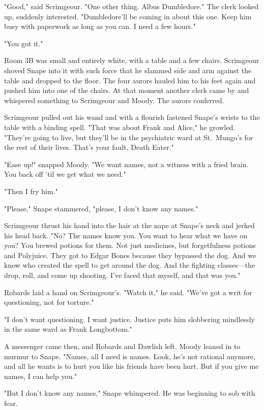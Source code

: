 "Good," said Scrimgeour. "One other thing. Albus Dumbledore." The clerk looked up, suddenly interested. "Dumbledore'll be coming in about this one. Keep him busy with paperwork as long as you can. I need a few hours."

"You got it."

Room 3B was small and entirely white, with a table and a few chairs. Scrimgeour shoved Snape into it with such force that he slammed side and arm against the table and dropped to the floor. The four aurors hauled him to his feet again and pushed him into one of the chairs. At that moment another clerk came by and whispered something to Scrimgeour and Moody. The aurors conferred.

Scrimgeour pulled out his wand and with a flourish fastened Snape's wrists to the table with a binding spell. "That was about Frank and Alice," he growled. "They're going to live, but they'll be in the psychiatric ward at St.~Mungo's for the rest of their lives. That's your fault, Death Eater."

"Ease up!" snapped Moody. "We want names, not a witness with a fried brain. You back off 'til we get what we need."

"Then I fry him."

"Please," Snape stammered, "please, I{\el} don't{\el} know any{\el} names."

Scrimgeour thrust his hand into the hair at the nape at Snape's neck and jerked his head back. "No? The names know you. You want to hear what we have on you? You brewed potions for them. Not just medicines, but forgetfulness potions and Polyjuice. They got to Edgar Bones because they bypassed the dog. And we know who created the spell to get around the dog. And the fighting classes—the drop, roll, and come up shooting. I've faced that myself, and that was you."

Robards laid a hand on Scrimgeour's. "Watch it," he said. "We've got a writ for questioning, not for torture."

"I don't want questioning. I want justice. Justice puts him slobbering mindlessly in the same ward as Frank Longbottom."

A messenger came then, and Robards and Dawlish left. Moody leaned in to murmur to Snape. "Names, all I need is names. Look, he's not rational anymore, and all he wants is to hurt you like his friends have been hurt. But if you give me names, I can help you."

"But I don't{\el} know any{\el} names," Snape whimpered. He was beginning to sob with fear.

